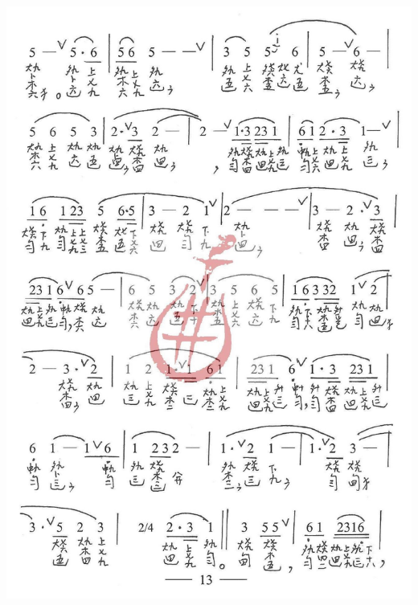 \documentclass[cn,pad,twocol]{elegantbook}
\begin{document}
\paragraph*{\includegraphics[width=\textwidth]{mudanting/2021-牡丹亭-13回生}} 
\end{document}
